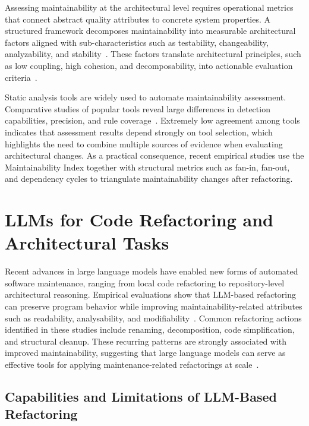 Assessing maintainability at the architectural level requires operational metrics that connect abstract quality attributes to concrete system properties. A structured framework decomposes maintainability into measurable architectural factors aligned with sub-characteristics such as testability, changeability, analyzability, and stability~\cite{rahmati2021ensuring}. These factors translate architectural principles, such as low coupling, high cohesion, and decomposability, into actionable evaluation criteria~\cite{bass2021software}.

Static analysis tools are widely used to automate maintainability assessment. Comparative studies of popular tools reveal large differences in detection capabilities, precision, and rule coverage~\cite{lenarduzzi2023critical}. Extremely low agreement among tools indicates that assessment results depend strongly on tool selection, which highlights the need to combine multiple sources of evidence when evaluating architectural changes. As a practical consequence, recent empirical studies use the Maintainability Index together with structural metrics such as fan-in, fan-out, and dependency cycles to triangulate maintainability changes after refactoring.

\section{LLMs for Code Refactoring and Architectural Tasks}

Recent advances in large language models have enabled new forms of automated software maintenance, ranging from local code refactoring to repository-level architectural reasoning. Empirical evaluations show that LLM-based refactoring can preserve program behavior while improving maintainability-related attributes such as readability, analysability, and modifiability~\cite{depalma2024exploring}. Common refactoring actions identified in these studies include renaming, decomposition, code simplification, and structural cleanup. These recurring patterns are strongly associated with improved maintainability, suggesting that large language models can serve as effective tools for applying maintenance-related refactorings at scale~\cite{depalma2024exploring}.

\subsection{Capabilities and Limitations of LLM-Based Refactoring}

